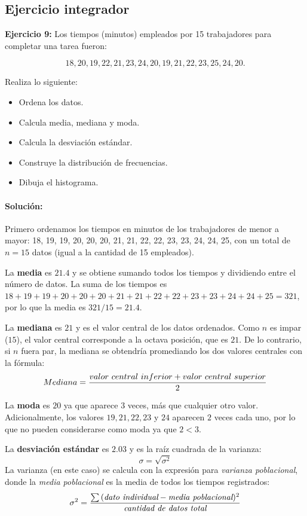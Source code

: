 \documentclass[12pt]{article}
\begin{document}
\subsection*{\centering Ejercicio integrador}
\textbf{Ejercicio 9:} Los tiempos (minutos) empleados por 15 trabajadores para completar una tarea fueron:

\[18, 20, 19, 22, 21, 23, 24, 20, 19, 21, 22, 23, 25, 24, 20.\]

Realiza lo siguiente:
\begin{itemize}
    \item Ordena los datos.
    \item Calcula media, mediana y moda.
    \item Calcula la desviación estándar.
    \item Construye la distribución de frecuencias.
    \item Dibuja el histograma.
\end{itemize}

\paragraph{\textbf{Solución: }}

Primero ordenamos los tiempos en minutos de los trabajadores de menor a mayor: 18, 19, 19, 20, 20, 20, 21, 21, 22, 22, 23, 23, 24, 24, 25, con un total de $n = 15$ datos (igual a la cantidad de 15 empleados).

La \textbf{media} es $21.4$ y se obtiene sumando todos los tiempos y dividiendo entre el número de datos. La suma de los tiempos es $18 + 19 + 19 + 20 + 20 + 20 + 21 + 21 + 22 + 22 + 23 + 23 + 24 + 24 + 25 = 321$, por lo que la media es $321/15 = 21.4$.

La \textbf{mediana} es $21$ y es el valor central de los datos ordenados. Como $n$ es impar ($15$), el valor central corresponde a la octava posición, que es $21$. De lo contrario, si $n$ fuera par, la mediana se obtendría promediando los dos valores centrales con la fórmula:
\[Mediana = {{valor\ central\ inferior + valor\ central\ superior} \over 2}\]

La \textbf{moda} es $20$ ya que aparece $3$ veces, más que cualquier otro valor. Adicionalmente, los valores $19, 21, 22, 23$ y $24$ aparecen $2$ veces cada uno, por lo que no pueden considerarse como moda ya que $2 < 3$.


La \textbf{desviación estándar} es $2.03$ y es la raíz cuadrada de la varianza:
\[\sigma = \sqrt{\sigma^2}\]
La varianza (en este caso) se calcula con la expresión para \textit{varianza poblacional}, donde la \textit{media poblacional} es la media de todos los tiempos registrados:
\[\sigma^2 = {\sum{(\textit{dato individual} - \textit{media poblacional})^2} \over \textit{cantidad de datos total}}\]
\end{document}
